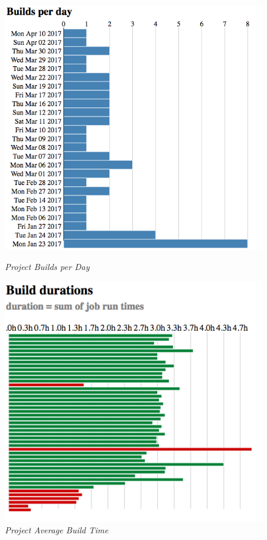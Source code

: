 \begin{figure}[!ht]
\centering
\begin{minipage}{.5\textwidth}
  \centering
  \includegraphics[width=\linewidth]{images/builds-per-day}
	\caption{\em Project Builds per Day}
	\label{fig:builds-per-day}
\end{minipage}%
\begin{minipage}{.5\textwidth}
  \centering
  \includegraphics[width=\linewidth]{images/build-time}
	\caption{\em Project Average Build Time}
	\label{fig:build-time}
\end{minipage}
\end{figure}
\clearpage

